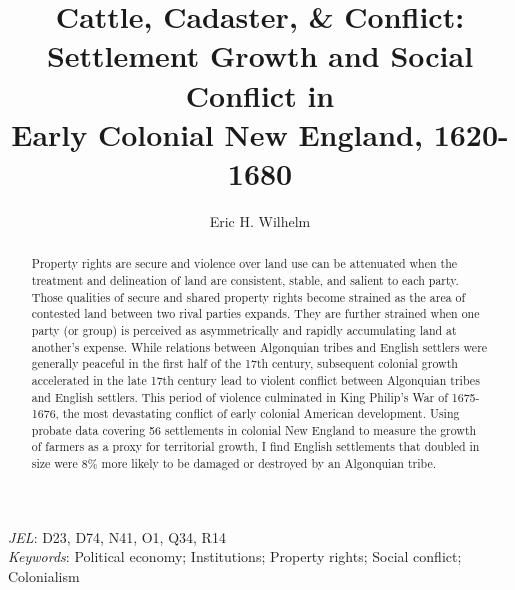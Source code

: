 \documentclass[11pt]{article}
\title{Cattle, Cadaster, \& Conflict: \\ Settlement Growth and Social Conflict in \\ Early Colonial New England, 1620-1680}
\author{Eric H. Wilhelm %
}
\date{}
\begin{document}
\maketitle

\begin{abstract}
\singlespacing
        Property rights are secure and violence over land use can be attenuated when the treatment and delineation of land are consistent, stable, and salient to each party. Those qualities of secure and shared property rights become strained as the area of contested land between two rival parties expands. They are further strained when one party (or group) is perceived as asymmetrically and rapidly accumulating land at another's expense. While relations between Algonquian tribes and English settlers were generally peaceful in the first half of the 17th century, subsequent colonial growth accelerated in the late 17th century lead to violent conflict between Algonquian tribes and English settlers. This period of violence culminated in King Philip's War of 1675-1676, the most devastating conflict of early colonial American development. Using probate data covering 56 settlements in colonial New England to measure the growth of farmers as a proxy for territorial growth, I find English settlements that doubled in size were 8\% more likely to be damaged or destroyed by an Algonquian tribe.     
  \end{abstract}
\textit{JEL}: D23, D74, N41, O1, Q34, R14 \\
\textit{Keywords}: Political economy; Institutions; Property rights; Social conflict; Colonialism

\pagebreak

\end{document}
